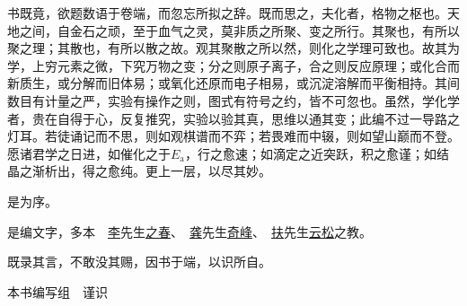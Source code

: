 书既竟，欲题数语于卷端，而忽忘所拟之辞。既而思之，夫化者，格物之枢也。天地之间，自金石之顽，至于血气之灵，莫非质之所聚、变之所行。其聚也，有所以聚之理；其散也，有所以散之故。观其聚散之所以然，则化之学理可致也。故其为学，上穷元素之微，下究万物之变；分之则原子离子，合之则反应原理；或化合而新质生，或分解而旧体易；或氧化还原而电子相易，或沉淀溶解而平衡相持。其间数目有计量之严，实验有操作之则，图式有符号之约，皆不可忽也。虽然，学化学者，贵在自得于心，反复推究，实验以验其真，思维以通其变；此编不过一导路之灯耳。若徒诵记而不思，则如观棋谱而不弈；若畏难而中辍，则如望山巅而不登。愿诸君学之日进，如催化之于\(E_\text{a}\)，行之愈速；如滴定之近突跃，积之愈谨；如结晶之渐析出，得之愈纯。更上一层，以尽其妙。

是为序。

\vspace{1.5\baselineskip}
{\small\raggedleft
是编文字，多本　\uline{李}先生\uline{之春}、　\uline{龚}先生\uline{奇峰}、　\uline{扶}先生\uline{云松}之教。\par
既录其言，不敢没其赐，因书于端，以识所自。\par
}
\vspace{1.2\baselineskip}
{\footnotesize\raggedleft
本书编写组　谨识\par
}

